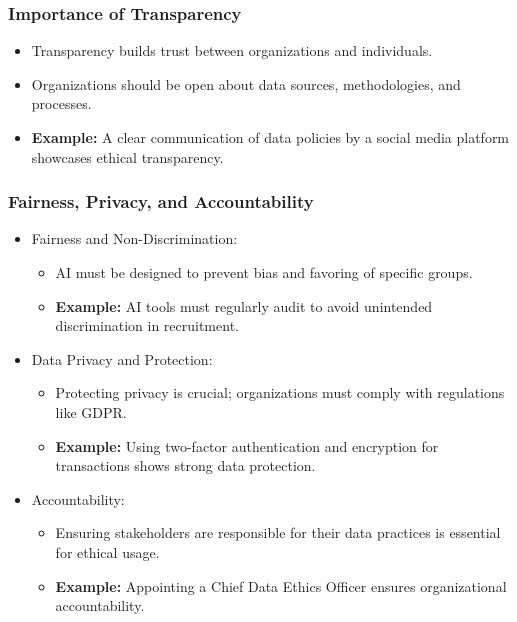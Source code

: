 \documentclass[aspectratio=169]{beamer}
\begin{document}
\begin{frame}[fragile]
    \frametitle{Importance of Transparency}
    \begin{itemize}
        \item Transparency builds trust between organizations and individuals.
        \item Organizations should be open about data sources, methodologies, and processes.
        \item {\bf Example:} A clear communication of data policies by a social media platform showcases ethical transparency.
    \end{itemize}
\end{frame}

\begin{frame}[fragile]
    \frametitle{Fairness, Privacy, and Accountability}
    \begin{itemize}
        \item Fairness and Non-Discrimination:
            \begin{itemize}
                \item AI must be designed to prevent bias and favoring of specific groups.
                \item {\bf Example:} AI tools must regularly audit to avoid unintended discrimination in recruitment.
            \end{itemize}
        \item Data Privacy and Protection:
            \begin{itemize}
                \item Protecting privacy is crucial; organizations must comply with regulations like GDPR.
                \item {\bf Example:} Using two-factor authentication and encryption for transactions shows strong data protection.
            \end{itemize}
        \item Accountability:
            \begin{itemize}
                \item Ensuring stakeholders are responsible for their data practices is essential for ethical usage.
                \item {\bf Example:} Appointing a Chief Data Ethics Officer ensures organizational accountability.
            \end{itemize}
    \end{itemize}
\end{frame}
\end{document}
